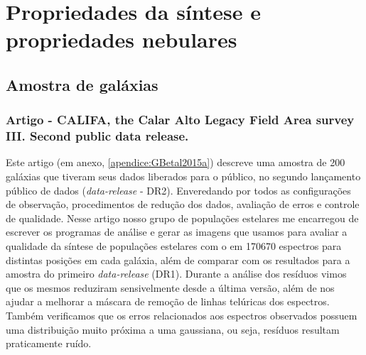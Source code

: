 


\chapter{Propriedades da síntese e propriedades nebulares}
\label{sec:synvsneb}

\section{Amostra de galáxias}
\label{sec:synvsneb:amostra}

\subsection{Artigo - CALIFA, the Calar Alto Legacy Field Area survey III. Second public data
release.}

Este artigo (em anexo, \ref{apendice:GBetal2015a}) descreve uma amostra de 200 galáxias que tiveram
seus dados liberados para o público, no segundo lançamento público de dados ({\em data-release} -
DR2). Enveredando por todos as configurações de observação, procedimentos de redução dos dados,
avaliação de erros e controle de qualidade. Nesse artigo nosso grupo de populações estelares me
encarregou de escrever os programas de análise e gerar as imagens que usamos para avaliar a
qualidade da síntese de populações estelares com o \starlight em 170670 espectros para distintas
posições em cada galáxia, além de comparar com os resultados para a amostra do primeiro {\em
data-release} (DR1). Durante a análise dos resíduos vimos que os mesmos reduziram sensivelmente
desde a última versão, além de nos ajudar a melhorar a máscara de remoção de linhas telúricas dos
espectros. Também verificamos que os erros relacionados aos espectros observados possuem uma
distribuição muito próxima a uma gaussiana, ou seja, resíduos resultam praticamente ruído.


